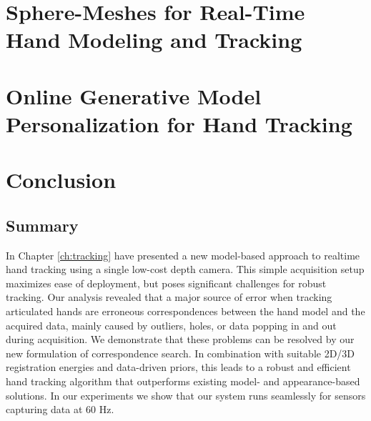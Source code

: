 \chapter{Sphere-Meshes for Real-Time Hand Modeling and Tracking} \label{ch:sphere-meshes}




 







\chapter{Online Generative Model Personalization for Hand Tracking} \label{ch:online}







%


\chapter{Conclusion}

\section{Summary}

In Chapter \ref{ch:tracking} have presented a new model-based approach to realtime hand tracking using a single low-cost depth camera. This simple acquisition setup maximizes ease of deployment, but poses significant challenges for robust tracking. 
Our analysis revealed that a major source of error when tracking articulated hands are erroneous correspondences between the hand model and the acquired data, mainly caused by outliers, holes, or data popping in and out during acquisition. 
We demonstrate that these problems can be resolved by our new formulation of correspondence search. In combination with suitable 2D/3D registration energies and data-driven priors, this leads to a robust and efficient hand tracking algorithm that outperforms existing model- and appearance-based solutions. In our experiments we show that our system runs seamlessly for sensors capturing data at 60 Hz. 

